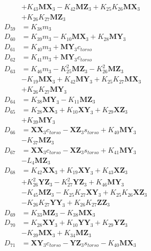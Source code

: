 \begin{multicols}{2}
\begin{align}
&+ K_{43}\mathbf{MX}_3 - K_{42}\mathbf{MZ}_3 + K_{25}K_{26}\mathbf{MX}_3  \nonumber \\
&+ K_{26}K_{27}\mathbf{MZ}_3 \nonumber \\
D_{59} &= K_{38}m_3 \nonumber \\
D_{60} &= K_{39}m_3 - K_{10}\mathbf{MX}_3 + K_{28}\mathbf{MY}_3 \nonumber \\
D_{61} &= K_{40}m_3 + \mathbf{MY}_3c_{torso} \nonumber \\
D_{62} &= K_{41}m_3 + \mathbf{MY}_3c_{torso} \nonumber \\
D_{63} &= K_{46}m_3 - K_{25}^2\mathbf{MZ}_3 - K_{26}^2\mathbf{MZ}_3  \nonumber \\
&- K_{19}\mathbf{MX}_3 + K_{42}\mathbf{MY}_3 + K_{25}K_{27}\mathbf{MX}_3  \nonumber \\
&+ K_{26}K_{27}\mathbf{MY}_3 \nonumber \\
D_{64} &= K_{38}\mathbf{MY}_3 - K_{11}\mathbf{MZ}_3 \nonumber \\
D_{65} &= K_{28}\mathbf{XX}_3 + K_{10}\mathbf{XY}_3 + K_{29}\mathbf{XZ}_3  \nonumber \\
&+ K_{39}\mathbf{MY}_3 \nonumber \\
D_{66} &= \mathbf{XX}_3c_{torso} - \mathbf{XZ}_3s_{torso} + K_{40}\mathbf{MY}_3  \nonumber \\
&- K_{37}\mathbf{MZ}_3 \nonumber \\
D_{67} &= \mathbf{XX}_3c_{torso} - \mathbf{XZ}_3s_{torso} + K_{41}\mathbf{MY}_3  \nonumber \\
&- L_4\mathbf{MZ}_3 \nonumber \\
D_{68} &= K_{42}\mathbf{XX}_3 + K_{19}\mathbf{XY}_3 + K_{43}\mathbf{XZ}_3  \nonumber \\
&+ K_{26}^2\mathbf{YZ}_3 - K_{27}^2\mathbf{YZ}_3 + K_{46}\mathbf{MY}_3  \nonumber \\
&- K_{45}\mathbf{MZ}_3 - K_{25}K_{27}\mathbf{XY}_3 + K_{25}K_{26}\mathbf{XZ}_3  \nonumber \\
&- K_{26}K_{27}\mathbf{YY}_3 + K_{26}K_{27}\mathbf{ZZ}_3 \nonumber \\
D_{69} &= K_{33}\mathbf{MZ}_3 - K_{38}\mathbf{MX}_3 \nonumber \\
D_{70} &= K_{28}\mathbf{XY}_3 + K_{10}\mathbf{YY}_3 + K_{29}\mathbf{YZ}_3  \nonumber \\
&- K_{39}\mathbf{MX}_3 + K_{34}\mathbf{MZ}_3 \nonumber \\
D_{71} &= \mathbf{XY}_3c_{torso} - \mathbf{YZ}_3s_{torso} - K_{40}\mathbf{MX}_3  \nonumber \\

\end{align}
\end{multicols}
